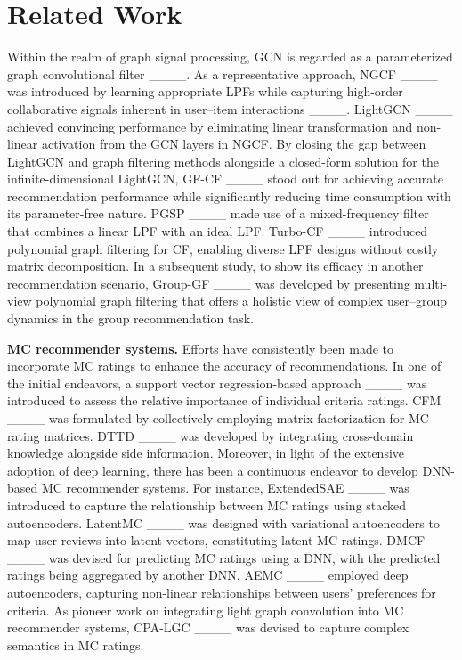 \section{Related Work}
\label{section 5}
 Within the realm of graph signal processing, GCN is regarded as a parameterized graph convolutional filter ____. As a representative approach, NGCF ____ was introduced by learning appropriate LPFs while capturing high-order collaborative signals inherent in user--item interactions ____. LightGCN ____ achieved convincing performance by eliminating linear transformation and non-linear activation from the GCN layers in NGCF. By closing the gap between LightGCN and graph filtering methods alongside a closed-form solution for the infinite-dimensional LightGCN, GF-CF ____ stood out for achieving accurate recommendation performance while significantly reducing time consumption with its parameter-free nature. PGSP ____ made use of a mixed-frequency filter that combines a linear LPF with an ideal LPF. Turbo-CF ____ introduced polynomial graph filtering for CF, enabling diverse LPF designs without costly matrix decomposition. In a subsequent study, to show its efficacy in another recommendation scenario, Group-GF ____ was developed by presenting multi-view polynomial graph filtering that offers a holistic view of complex user--group dynamics in the group recommendation task. 

\noindent\textbf{MC recommender systems.} Efforts have consistently been made to incorporate MC ratings to enhance the accuracy of recommendations. In one of the initial endeavors, a support vector regression-based approach ____ was introduced to assess the relative importance of individual criteria ratings. CFM ____ was formulated by collectively employing matrix factorization for MC rating matrices. DTTD ____ was developed by integrating cross-domain knowledge alongside side information. Moreover, in light of the extensive adoption of deep learning, there has been a continuous endeavor to develop DNN-based MC recommender systems. For instance, ExtendedSAE ____ was introduced to capture the relationship between MC ratings using stacked autoencoders. LatentMC ____ was designed with variational autoencoders to map user reviews into latent vectors, constituting latent MC ratings. DMCF ____ was devised for predicting MC ratings using a DNN, with the predicted ratings being aggregated by another DNN. AEMC ____ employed deep autoencoders, capturing non-linear relationships between users' preferences for criteria. As pioneer work on integrating light graph convolution into MC recommender systems, CPA-LGC ____ was devised to capture complex semantics in MC ratings. 
\vspace{-3mm}